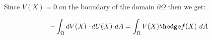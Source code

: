 \documentclass{birkjour}
\numberwithin{equation}{section}
\begin{document}
Since $V(X) = 0$ on the boundary of the domain $\partial \Omega$ then we get:

\begin{eqnarray} 
	- \int_{\Omega} { dV(X) \cdot dU(X) \ dA } = \int_{\Omega} { V(X) \hodge f(X) \ dA } \nonumber
\end{eqnarray}





\end{document}
